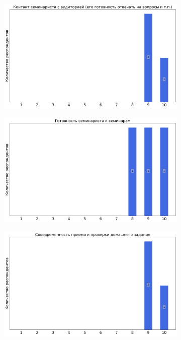             \begin{figure}[H]
                \centering
                \begin{subfigure}[b]{0.45\textwidth}
                    \centering
                    \includegraphics[width=\textwidth]{images/3 course/Общая физика - квантовая физика/seminarists-marks-Инжечик Л.В.-0.png}
                \end{subfigure}
                \begin{subfigure}[b]{0.45\textwidth}
                    \centering
                    \includegraphics[width=\textwidth]{images/3 course/Общая физика - квантовая физика/seminarists-marks-Инжечик Л.В.-1.png}
                \end{subfigure}
                \begin{subfigure}[b]{0.45\textwidth}
                    \centering
                    \includegraphics[width=\textwidth]{images/3 course/Общая физика - квантовая физика/seminarists-marks-Инжечик Л.В.-2.png}

\end{subfigure}
\end{figure}
